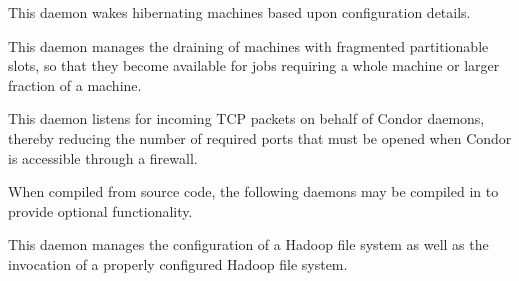 \begin{description}
\item[\Condor{rooster}] This daemon wakes hibernating machines based
upon configuration details.

\item[\Condor{defrag}] This daemon manages the draining of machines
with fragmented partitionable slots, so that they become available
for jobs requiring a whole machine or larger fraction of a machine.

\item[\Condor{shared\_port}] This daemon listens for incoming TCP packets
on behalf of Condor daemons, thereby reducing the number of required
ports that must be opened when Condor is accessible through a firewall. 

\end{description} 

When compiled from source code,
the following daemons may be compiled in to provide optional functionality.
\begin{description} 

\item[\Condor{hdfs}] This daemon manages the configuration of a
Hadoop file system as well as the invocation of a properly configured
Hadoop file system.

\end{description} 



